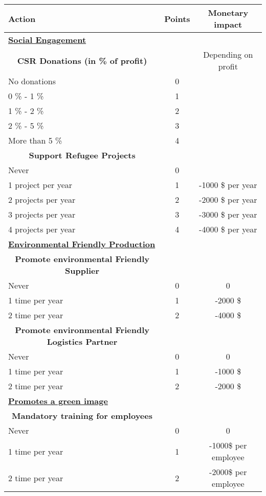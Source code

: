 \begin{longtable}[]{l|c|c}
     \textbf{Action} & \textbf{Points} & \textbf{Monetary impact} \\
     \hline \hline
     \underline{\textbf{Social Engagement}} & & \\ [1ex]
     \multicolumn{1}{c|}{\textbf{CSR Donations (in \% of profit)}} & & Depending on profit \\
     No donations & 0 &  \\
     0 \% - 1 \% & 1 &  \\
     1 \% - 2 \% & 2 &   \\
     2 \% - 5 \% & 3 &   \\
     More than 5 \% & 4 &   \\ [1ex]
     \multicolumn{1}{c|}{\textbf{Support Refugee Projects}} & & \\
     Never & 0 &  \\
     1 project per year & 1 & -1000 \$ per year  \\
     2 projects per year & 2 & -2000 \$ per year   \\
     3 projects per year & 3 & -3000 \$ per year  \\
     4 projects per year & 4 & -4000 \$ per year  \\
     \hline \hline
     \underline{\textbf{Environmental Friendly Production}} & & \\ [1ex]
     \multicolumn{1}{c|}{\textbf{Promote environmental Friendly Supplier}} & & \\
     Never & 0 & 0 \\
     1 time per year & 1 & -2000 \$  \\
     2 time per year & 2 & -4000 \$  \\
     \multicolumn{1}{c|}{\textbf{Promote environmental Friendly Logistics Partner}} & & \\
     Never & 0 & 0 \\
     1 time per year & 1 & -1000 \$  \\
     2 time per year & 2 & -2000 \$  \\
     \hline \hline
     \underline{\textbf{Promotes a green image}} & & \\ [1ex]
     \multicolumn{1}{c|}{\textbf{Mandatory training for employees}} & & \\
     Never & 0 & 0 \\
     1 time per year & 1 & -1000\$ per employee  \\
     2 time per year & 2 & -2000\$ per employee  \\

\end{longtable}
